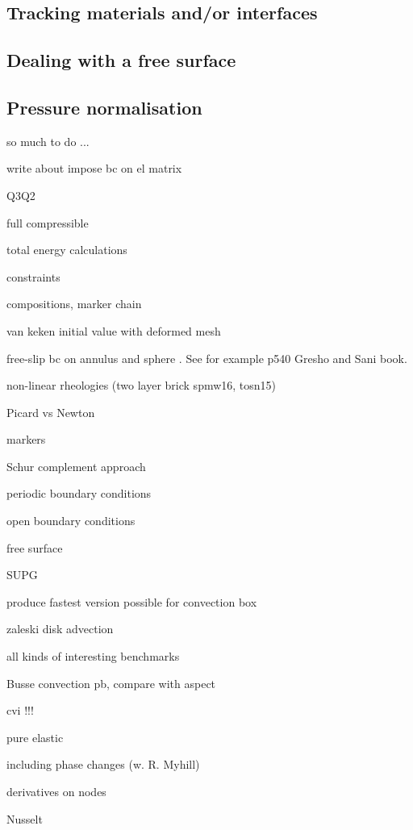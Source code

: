 \documentclass[a4paper]{article}
\begin{document}
\subsection{Tracking materials and/or interfaces}

\subsection{Dealing with a free surface}

\subsection{Pressure normalisation}







\newpage
so much to do ... 

write about impose bc on el matrix

Q3Q2

full compressible 

total energy calculations

constraints

compositions, marker chain

van keken initial value with deformed mesh

free-slip bc on annulus and sphere . See for example p540 Gresho and Sani book.

non-linear rheologies (two layer brick spmw16, tosn15) 

Picard vs Newton

markers

Schur complement approach

periodic boundary conditions

open boundary conditions

free surface 

SUPG

produce fastest version possible for convection box

zaleski disk advection

all kinds of interesting benchmarks

Busse convection pb, compare with aspect 

cvi !!!

pure elastic 

including phase changes (w. R. Myhill)

derivatives on nodes

Nusselt
\end{document}
